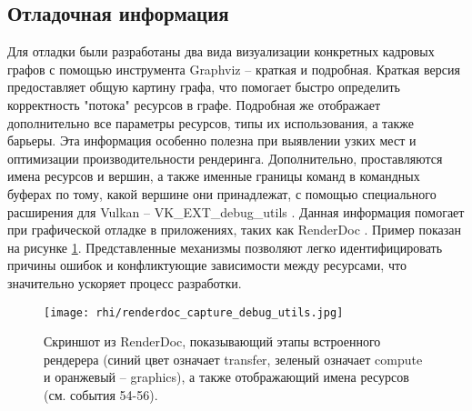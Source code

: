 \subsection{Отладочная информация}
Для отладки были разработаны два вида визуализации конкретных кадровых графов с помощью инструмента Graphviz \cite{graphviz} -- краткая и подробная. Краткая версия предоставляет общую картину графа, что помогает быстро определить корректность "потока" ресурсов в графе. Подробная же отображает дополнительно все параметры ресурсов, типы их использования, а также барьеры. Эта информация особенно полезна при выявлении узких мест и оптимизации производительности рендеринга. Дополнительно, проставляются имена ресурсов и вершин, а также именные границы команд в командных буферах по тому, какой вершине они принадлежат, с помощью специального расширения для Vulkan -- VK\_EXT\_debug\_utils \cite{vulkan_ext_debug_utils}. Данная информация помогает при графической отладке в приложениях, таких как RenderDoc \cite{renderdoc}. Пример показан на рисунке \ref{fig:renderdoc_capture_debug_utils}. Представленные механизмы позволяют легко идентифицировать причины ошибок и конфликтующие зависимости между ресурсами, что значительно ускоряет процесс разработки.

\begin{figure}[h]
    \centering
    \texttt{[image: rhi/renderdoc\_capture\_debug\_utils.jpg]}
    \caption{Скриншот из RenderDoc, показывающий этапы встроенного рендерера (синий цвет означает transfer, зеленый означает compute и оранжевый -- graphics), а также отображающий имена ресурсов (см. события 54-56).}
    \label{fig:renderdoc_capture_debug_utils}
\end{figure}

